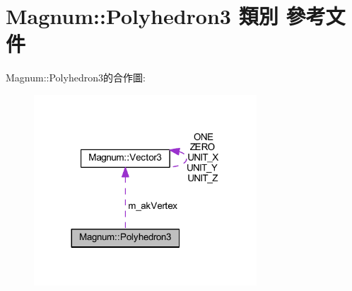 \hypertarget{class_magnum_1_1_polyhedron3}{}\section{Magnum\+:\+:Polyhedron3 類別 參考文件}
\label{class_magnum_1_1_polyhedron3}


Magnum\+:\+:Polyhedron3的合作圖\+:\nopagebreak
\begin{figure}[H]
\begin{center}
\leavevmode
\includegraphics[width=236pt]{class_magnum_1_1_polyhedron3__coll__graph}
\end{center}
\end{figure}
